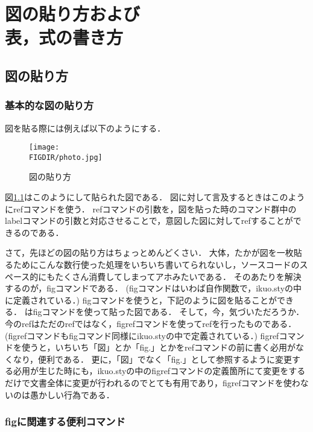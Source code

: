 \chapter[図の貼り方および表，式の書き方]{図の貼り方および\\表，式の書き方 }

\section{図の貼り方}

\subsection{基本的な図の貼り方}
図を貼る際には例えば以下のようにする．
\begin{figure}[t]%
  \begin{center}%
    \texttt{[image: \\FIGDIR/photo.jpg]}%
    \caption{図の貼り方}%
    \label{fig:lab}%
  \end{center}%
\end{figure}%
図\ref{fig:lab}はこのようにして貼られた図である．
図に対して言及するときはこのようにrefコマンドを使う．
refコマンドの引数を，図を貼った時のコマンド群中のlabelコマンドの引数と対応させることで，意図した図に対してrefすることができるのである．

さて，先ほどの図の貼り方はちょっとめんどくさい．
大体，たかが図を一枚貼るためにこんな数行使った処理をいちいち書いてられないし，ソースコードのスペース的にもたくさん消費してしまってアホみたいである．
そのあたりを解決するのが，figコマンドである．
(figコマンドはいわば自作関数で，ikuo.styの中に定義されている．)
figコマンドを使うと，下記のように図を貼ることができる．
はfigコマンドを使って貼った図である．
そして，今，気づいただろうか．
今のrefはただのrefではなく，figrefコマンドを使ってrefを行ったものである．
(figrefコマンドもfigコマンド同様にikuo.styの中で定義されている．)
figrefコマンドを使うと，いちいち「図」とか「fig.」とかをrefコマンドの前に書く必用がなくなり，便利である．
更に，「図」でなく「fig.」として参照するように変更する必用が生じた時にも，ikuo.styの中のfigrefコマンドの定義箇所にて変更をするだけで文書全体に変更が行われるのでとても有用であり，figrefコマンドを使わないのは愚かしい行為である．


\subsection{figに関連する便利コマンド}


